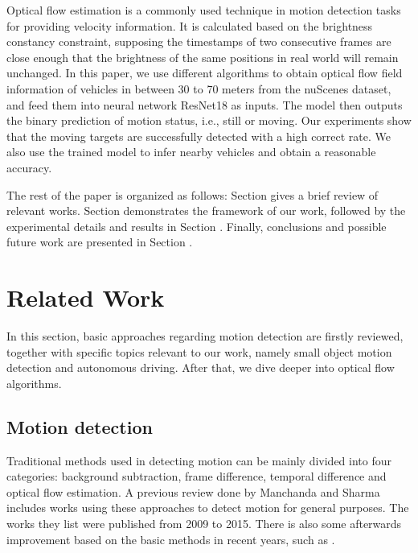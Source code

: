 \documentclass[10pt, a4paper, twocolumn]{article}
\begin{document}
    Optical flow estimation is a commonly used technique in motion detection tasks for providing velocity information. It is calculated based on the brightness constancy constraint, supposing the timestamps of two consecutive frames are close enough that the brightness of the same positions in real world will remain unchanged. In this paper, we use different algorithms to obtain optical flow field information of vehicles in between 30 to 70 meters from the nuScenes \cite{nuscenes2019} dataset, and feed them into neural network ResNet18 \cite{DBLP:journals/corr/HeZRS15} as inputs. The model then outputs the binary prediction of motion status, i.e., still or moving. Our experiments show that the moving targets are successfully detected with a high correct rate. We also use the trained model to infer nearby vehicles and obtain a reasonable accuracy.
    
    The rest of the paper is organized as follows: Section  gives a brief review of relevant works. Section  demonstrates the framework of our work, followed by the experimental details and results in Section . Finally, conclusions and possible future work are presented in Section .
    
    
\section{\large Related Work}

    In this section, basic approaches regarding motion detection are firstly reviewed, together with specific topics relevant to our work, namely small object motion detection and autonomous driving. After that, we dive deeper into optical flow algorithms.

\subsection{\normalsize Motion detection}

    Traditional methods used in detecting motion can be mainly divided into four categories: background subtraction, frame difference, temporal difference and optical flow estimation. A previous review done by Manchanda and Sharma \cite{7508161} includes works using these approaches to detect motion for general purposes. The works they list were published from 2009 to 2015. There is also some afterwards improvement based on the basic methods in recent years, such as  \cite{8864015}\cite{8328591}\cite{9429516}\cite{8833206}. 
    
\end{document}
